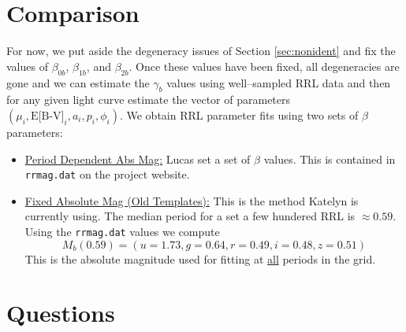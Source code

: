 \documentclass[12pt]{article}
\begin{document}
\section{Comparison}
\label{sec:compare}

For now, we put aside the degeneracy issues of Section \ref{sec:nonident} and fix the values of $\beta_{0b}$, $\beta_{1b}$, and $\beta_{2b}$. Once these values have been fixed, all degeneracies are gone and we can estimate the $\gamma_b$ values using well--sampled RRL data and then for any given light curve estimate the vector of parameters $(\mu_i,\text{E[B-V]}_i,a_i,p_i,\phi_i)$. We obtain RRL parameter fits using two sets of $\beta$ parameters:
\begin{itemize}
\item \underline{Period Dependent Abs Mag:} Lucas set a set of $\beta$ values. This is contained in \texttt{rrmag.dat} on the project website.
\item \underline{Fixed Absolute Mag (Old Templates):} This is the method Katelyn is currently using. The median period for a set a few hundered RRL is $\approx 0.59$. Using the \texttt{rrmag.dat} values we compute
  \begin{equation*}
    M_b(0.59) = (u=1.73,g=0.64,r=0.49,i=0.48,z=0.51)
  \end{equation*}
  This is the absolute magnitude used for fitting at \underline{all} periods in the grid.
\end{itemize}

\section{Questions}
\label{sec:questions}



%
%
\end{document}
